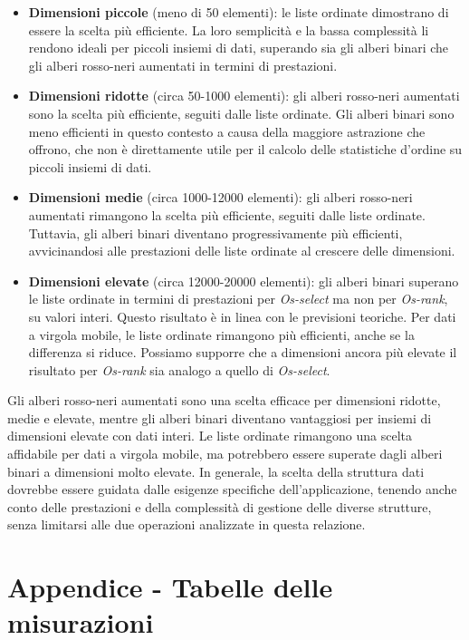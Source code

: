 \documentclass[onecolumn]{article}
\begin{document}
\begin{itemize}
\item \textbf{Dimensioni piccole} (meno di 50 elementi): le liste ordinate dimostrano di essere la scelta più efficiente. La loro semplicità e la bassa complessità li rendono ideali per piccoli insiemi di dati, superando sia gli alberi binari che gli alberi rosso-neri aumentati in termini di prestazioni.

\item \textbf{Dimensioni ridotte} (circa 50-1000 elementi): gli alberi rosso-neri aumentati sono la scelta più efficiente, seguiti dalle liste ordinate. Gli alberi binari sono meno efficienti in questo contesto a causa della maggiore astrazione che offrono, che non è direttamente utile per il calcolo delle statistiche d'ordine su piccoli insiemi di dati.

\item \textbf{Dimensioni medie} (circa 1000-12000 elementi): gli alberi rosso-neri aumentati rimangono la scelta più efficiente, seguiti dalle liste ordinate. Tuttavia, gli alberi binari diventano progressivamente più efficienti, avvicinandosi alle prestazioni delle liste ordinate al crescere delle dimensioni.

\item \textbf{Dimensioni elevate} (circa 12000-20000 elementi): gli alberi binari superano le liste ordinate in termini di prestazioni per \textit{Os-select} ma non per \textit{Os-rank}, su valori interi. Questo risultato è in linea con le previsioni teoriche. Per dati a virgola mobile, le liste ordinate rimangono più efficienti, anche se la differenza si riduce. Possiamo supporre che a dimensioni ancora più elevate il risultato per \textit{Os-rank} sia analogo a quello di \textit{Os-select}. 
\end{itemize}

Gli alberi rosso-neri aumentati sono una scelta efficace per dimensioni ridotte, medie e elevate, mentre gli alberi binari diventano vantaggiosi per insiemi di dimensioni elevate con dati interi. Le liste ordinate rimangono una scelta affidabile per dati a virgola mobile, ma potrebbero essere superate dagli alberi binari a dimensioni molto elevate.
In generale, la scelta della struttura dati dovrebbe essere guidata dalle esigenze specifiche dell'applicazione, tenendo anche conto delle prestazioni e della complessità di gestione delle diverse strutture, senza limitarsi alle due operazioni analizzate in questa relazione.

\newpage
\section{Appendice - Tabelle delle misurazioni}
\end{document}
